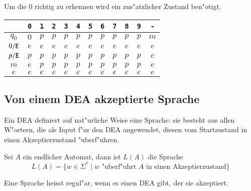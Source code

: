\begin{beispiel} Um die $0$ richtig zu erkennen
wird ein zus"atzlicher Zustand ben"otigt.

\begin{center}
\begin{tabular}{|c|ccccccccccc|}
\hline
&\tt 0&\tt 1&\tt 2&\tt 3&\tt 4&\tt 5&\tt 6&\tt 7&\tt 8&\tt 9&\tt -\\
\hline
$q_0$&$0$&$p$&$p$&$p$&$p$&$p$&$p$&$p$&$p$&$p$&$m$\\
$0{\tt /E}$&$e$&$e$&$e$&$e$&$e$&$e$&$e$&$e$&$e$&$e$&$e$\\
$p{\tt /E}$&$p$&$p$&$p$&$p$&$p$&$p$&$p$&$p$&$p$&$p$&$e$\\
$m$&$e$&$p$&$p$&$p$&$p$&$p$&$p$&$p$&$p$&$p$&$e$\\
$e$&$e$&$e$&$e$&$e$&$e$&$e$&$e$&$e$&$e$&$e$&$e$\\
\hline
\end{tabular}
\end{center}

\end{beispiel}

\subsection{Von einem DEA akzeptierte Sprache}
Ein DEA definiert auf nat"urliche Weise eine Sprache: sie besteht aus
allen W"ortern, die als Input f"ur den DEA angewendet, diesen vom
Startzustand in einen Akzeptierzustand "uberf"uhren.

\begin{definition}
Sei $A$ ein endlicher Automat, dann ist $L(A)$ die Sprache
\[
L(A)=\{w\in\Sigma^*\;|\; \text{$w$ "uberf"uhrt $A$ in einen Akzeptierzustand}\}
\]
\end{definition}

\begin{definition}
Eine Sprache heisst regul"ar, wenn es einen DEA gibt, der sie
akzeptiert.
\end{definition}

